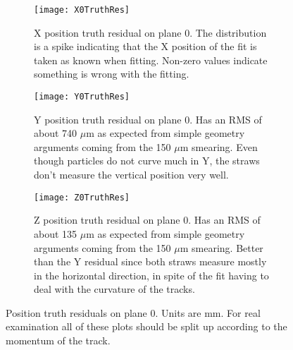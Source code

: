 \begin{figure}
    \centering
    \begin{subfigure}[]{0.6\textwidth}
        \centering
        \texttt{[image: X0TruthRes]} 
        \caption{X position truth residual on plane 0. The distribution is a spike indicating that the X position of the fit is taken as known when fitting. Non-zero values indicate something is wrong with the fitting.}
    \end{subfigure}

    \begin{subfigure}[]{0.6\textwidth}
        \centering
        \texttt{[image: Y0TruthRes]} 
        \caption{Y position truth residual on plane 0. Has an RMS of about 740 $\mu$m as expected from simple geometry arguments coming from the 150 $\mu$m smearing. Even though particles do not curve much in Y, the straws don't measure the vertical position very well.}
    \end{subfigure}
    
    \begin{subfigure}[]{0.6\textwidth}
        \centering
        \texttt{[image: Z0TruthRes]} 
        \caption{Z position truth residual on plane 0. Has an RMS of about 135 $\mu$m as expected from simple geometry arguments coming from the 150 $\mu$m smearing. Better than the Y residual since both straws measure mostly in the horizontal direction, in spite of the fit having to deal with the curvature of the tracks.}
    \end{subfigure}

    \caption{Position truth residuals on plane 0. Units are mm. For real examination all of these plots should be split up according to the momentum of the track.}
\end{figure}




